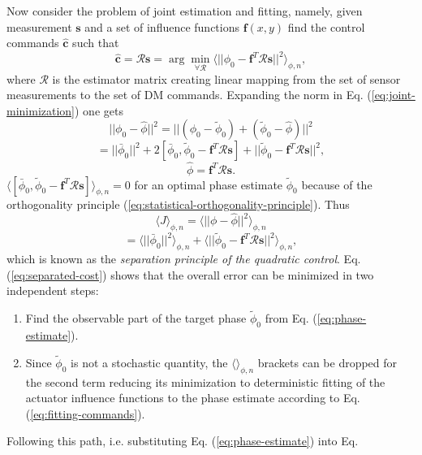 Now consider the problem of joint estimation and fitting, namely, given
measurement $\bm{s}$ and a set of influence functions $\bm{f}(x,y)$ find the
control commands $\hat{\bm{c}}$ such that
\begin{equation} \label{eq:joint-minimization}
	\hat{\bm{c}} = \mathcal{R} \bm{s} =
	\arg \min_{\forall \mathcal{R}}
	\langle
	|| \phi_{0} - \bm{f}^{T} \mathcal{R} \bm{s} ||^{2}
	\rangle_{\phi,n},
\end{equation}
where $\mathcal{R}$ is the estimator matrix creating linear mapping from the
set of sensor measurements to the set of DM commands. Expanding the norm in Eq.
(\ref{eq:joint-minimization}) one gets
\begin{equation} \label{eq:cost-expansion}
  || \phi_{0} - \hat{\phi} ||^{2} =
  || (\phi_{0} - \tilde{\phi}_{0}) + (\tilde{\phi}_{0} - \hat{\phi}) ||^{2}
\end{equation}
$$
 = || \bar{\phi}_{0} ||^{2} +
   2 [\bar{\phi}_{0},
     \tilde{\phi}_{0} - \bm{f}^{T} \mathcal{R} \bm{s} ] +
   || \tilde{\phi}_{0} - \bm{f}^{T} \mathcal{R} \bm{s} ||^{2},
$$
$$
  \hat{\phi} = \bm{f}^{T} \mathcal{R} \bm{s}.
$$
$
\langle
[\bar{\phi}_{0}, \tilde{\phi}_{0} - \bm{f}^{T} \mathcal{R} \bm{s} ]
\rangle_{\phi,n} = 0
$
for an optimal phase estimate $\tilde{\phi}_{0}$ because of the orthogonality
principle (\ref{eq:statistical-orthogonality-principle}). Thus
\begin{equation} \label{eq:separated-cost}
	\langle J \rangle_{\phi,n} =
	\langle || \phi - \hat{\phi} ||^{2} \rangle_{\phi,n}
\end{equation}
$$
  = \langle || \bar{\phi}_{0} ||^{2} \rangle_{\phi,n} +
    \langle
    || \tilde{\phi}_{0} - \bm{f}^{T} \mathcal{R} \bm{s} ||^{2}
    \rangle_{\phi,n},
$$
which is known as the \emph{separation principle of the quadratic control}.
Eq. (\ref{eq:separated-cost}) shows that the overall error can be minimized
in two independent steps:
\begin{enumerate}
	\item Find the observable part of the target phase $\tilde{\phi}_{0}$ from Eq.
  (\ref{eq:phase-estimate}).
  \item Since $\tilde{\phi}_{0}$ is not a stochastic quantity, the $\langle
  \rangle_{\phi,n}$ brackets can be dropped for the second term reducing its
  minimization to deterministic fitting of the actuator influence
  functions to the phase estimate according to Eq. (\ref{eq:fitting-commands}).
\end{enumerate}
Following this path, i.e. substituting Eq. (\ref{eq:phase-estimate}) into Eq.
